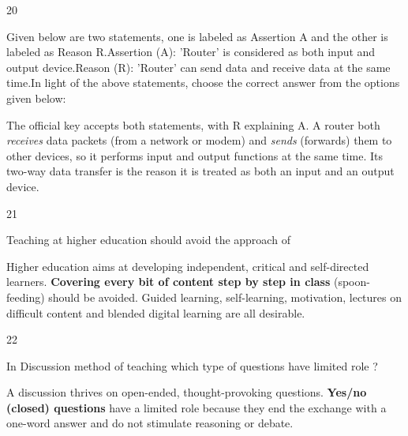 \begin{question}{20}
{Given below are two statements, one is labeled as Assertion A and the other is labeled as Reason R.\newline Assertion (A): 'Router' is considered as both input and output device.\newline Reason (R): 'Router' can send data and receive data at the same time.\newline In light of the above statements, choose the correct answer from the options given below:\par}
\begin{explain}
The official key accepts both statements, with R explaining A. A router both \emph{receives} data packets (from a network or modem) and \emph{sends} (forwards) them to other devices, so it performs input and output functions at the same time. Its two-way data transfer is the reason it is treated as both an input and an output device.
\end{explain}
\end{question}

\begin{question}{21}
{Teaching at higher education should avoid the approach of\par}
\begin{explain}
Higher education aims at developing independent, critical and self-directed learners. \textbf{Covering every bit of content step by step in class} (spoon-feeding) should be avoided. Guided learning, self-learning, motivation, lectures on difficult content and blended digital learning are all desirable.
\end{explain}
\end{question}

\begin{question}{22}
{In Discussion method of teaching which type of questions have limited role ?\par}
\begin{explain}
A discussion thrives on open-ended, thought-provoking questions. \textbf{Yes/no (closed) questions} have a limited role because they end the exchange with a one-word answer and do not stimulate reasoning or debate.
\end{explain}
\end{question}

